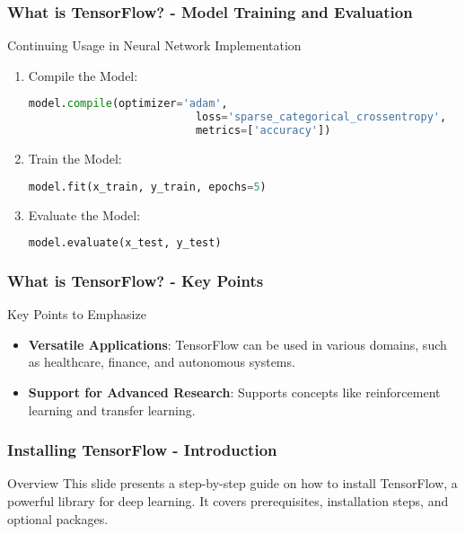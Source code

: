 \documentclass[aspectratio=169]{beamer}
\begin{document}
\begin{frame}[fragile]
    \frametitle{What is TensorFlow? - Model Training and Evaluation}
    \begin{block}{Continuing Usage in Neural Network Implementation}
    \end{block}
    
    \begin{enumerate}[resume]
        \item Compile the Model:
            \begin{lstlisting}[basicstyle=\ttfamily, language=Python]
            model.compile(optimizer='adam',
                          loss='sparse_categorical_crossentropy',
                          metrics=['accuracy'])
            \end{lstlisting}
        \item Train the Model:
            \begin{lstlisting}[basicstyle=\ttfamily, language=Python]
            model.fit(x_train, y_train, epochs=5)
            \end{lstlisting}
        \item Evaluate the Model:
            \begin{lstlisting}[basicstyle=\ttfamily, language=Python]
            model.evaluate(x_test, y_test)
            \end{lstlisting}
    \end{enumerate}
\end{frame}

\begin{frame}[fragile]
    \frametitle{What is TensorFlow? - Key Points}
    \begin{block}{Key Points to Emphasize}
    \begin{itemize}
        \item \textbf{Versatile Applications}: TensorFlow can be used in various domains, such as healthcare, finance, and autonomous systems.
        \item \textbf{Support for Advanced Research}: Supports concepts like reinforcement learning and transfer learning.
    \end{itemize}
    \end{block}
\end{frame}

\begin{frame}[fragile]
    \frametitle{Installing TensorFlow - Introduction}
    \begin{block}{Overview}
        This slide presents a step-by-step guide on how to install TensorFlow, a powerful library for deep learning. It covers prerequisites, installation steps, and optional packages.
    \end{block}
\end{frame}
\end{document}
